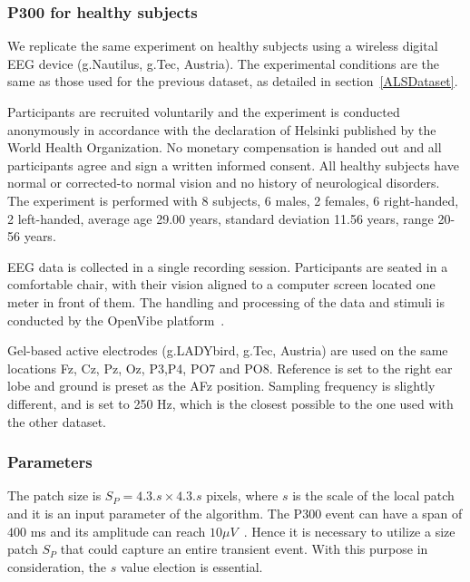 \documentclass[utf8]{frontiersSCNS} %
\begin{document}
\subsubsection{P300 for healthy subjects}

We replicate the same experiment on healthy subjects using a wireless digital EEG device (g.Nautilus, g.Tec, Austria).  The experimental conditions are the same as those used for the previous dataset, as detailed in section~\ref{ALSDataset}.

Participants are recruited voluntarily and the experiment is conducted anonymously in accordance with the declaration of Helsinki published by the World Health Organization.  No monetary compensation is handed out and all participants agree and sign a written informed consent.  All healthy subjects have normal or corrected-to normal vision and no history of neurological disorders. The experiment is performed with 8 subjects, 6 males, 2 females, 6 right-handed, 2 left-handed, average age 29.00 years, standard deviation  11.56 years, range 20-56 years.

EEG data is collected in a single recording session. Participants are seated in a comfortable chair, with their vision aligned to a computer screen located one meter in front of them.  The handling and processing of the data and stimuli is conducted by the OpenVibe platform~\citep{Renard2010}. 

Gel-based active electrodes (g.LADYbird, g.Tec, Austria) are used on the same locations Fz, Cz, Pz, Oz, P3,P4, PO7 and PO8.  Reference is set to the right ear lobe and ground is preset as the AFz position.   Sampling frequency is slightly different, and is set to 250 Hz, which is the closest possible to the one used with the other dataset.



\subsubsection{Parameters}

The patch size is $S_P = 4.3.s \times 4.3.s$ pixels, where $s$ is the scale of the local patch and it is an input parameter of the algorithm. The P300 event can have a span of $400$ ms and its amplitude can reach $ 10 \mu V $~\citep{Rao2013}.  Hence it is necessary to utilize a size patch $S_P$ that could capture an entire transient event. With this purpose in consideration, the $s$ value election is essential.
\end{document}
